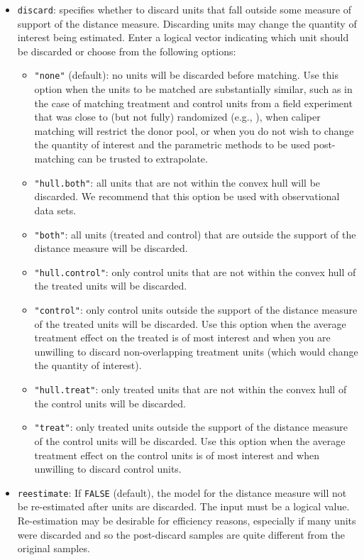 \begin{itemize}
\item \texttt{discard}: specifies whether to discard units that fall
  outside some measure of support of the distance measure.  Discarding
  units may change the quantity of interest being estimated. Enter a
  logical vector indicating which unit should be discarded or choose
  from the following options:
  \begin{itemize}
  \item \texttt{"none"} (default): no units will be discarded before
    matching.  Use this option when the units to be matched are
    substantially similar, such as in the case of matching treatment
    and control units from a field experiment that was close to (but
    not fully) randomized (e.g., \citealt{Imai05}), when caliper
    matching will restrict the donor pool, or when you do not wish to
    change the quantity of interest and the parametric methods to be
    used post-matching can be trusted to extrapolate.
  \item \texttt{"hull.both"}: all units that are not within the convex
    hull will be discarded.  We recommend that this option be used
    with observational data sets.
  \item \texttt{"both"}: all units (treated and control) that are
    outside the support of the distance measure will be discarded.
  \item \texttt{"hull.control"}: only control units that are not
    within the convex hull of the treated units will be discarded.  
  \item \texttt{"control"}: only control units outside the support of
    the distance measure of the treated units will be discarded.  Use
    this option when the average treatment effect on the treated is of
    most interest and when you are unwilling to discard
    non-overlapping treatment units (which would change the quantity
    of interest).
  \item \texttt{"hull.treat"}: only treated units that are not within
    the convex hull of the control units will be discarded. 
  \item \texttt{"treat"}: only treated units outside the support of
    the distance measure of the control units will be discarded.  Use
    this option when the average treatment effect on the control units
    is of most interest and when unwilling to discard control units.
  \end{itemize}
  
\item \texttt{reestimate}: If {\tt FALSE} (default), the model for the
  distance measure will not be re-estimated after units are discarded.
  The input must be a logical value.  Re-estimation may be desirable
  for efficiency reasons, especially if many units were discarded and
  so the post-discard samples are quite different from the original
  samples.
  
\end{itemize}

